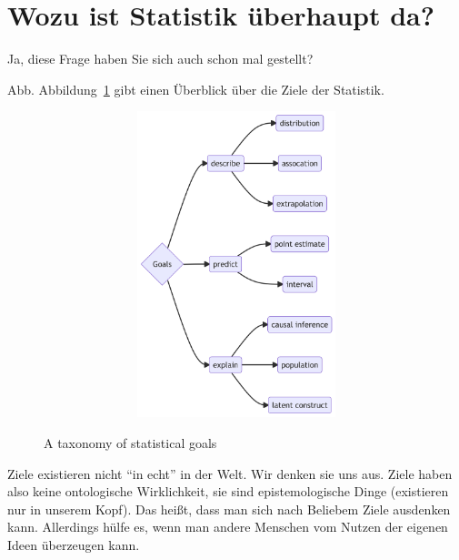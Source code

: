 \documentclass[
  a4paper,
  DIV=11]{scrreprt}
\theoremstyle{definition}
\theoremstyle{remark}
\begin{document}
\hypertarget{wozu-ist-statistik-uxfcberhaupt-da}{%
\section{Wozu ist Statistik überhaupt
da?}\label{wozu-ist-statistik-uxfcberhaupt-da}}

Ja, diese Frage haben Sie sich auch schon mal gestellt?

Abb. Abbildung~\ref{fig-goals} gibt einen Überblick über die Ziele der
Statistik.

\begin{figure}

{\centering 

\begin{figure}[H]

{\centering \includegraphics[width=5.5in,height=3.5in]{./Inferenz_files/figure-latex/mermaid-figure-1.png}

}

\end{figure}

}

\caption{\label{fig-goals}A taxonomy of statistical goals}

\end{figure}

\begin{tcolorbox}[enhanced jigsaw, leftrule=.75mm, toptitle=1mm, bottomtitle=1mm, titlerule=0mm, breakable, colframe=quarto-callout-note-color-frame, title=\textcolor{quarto-callout-note-color}{\faInfo}\hspace{0.5em}{Hinweis}, rightrule=.15mm, colback=white, arc=.35mm, left=2mm, bottomrule=.15mm, coltitle=black, opacitybacktitle=0.6, toprule=.15mm, colbacktitle=quarto-callout-note-color!10!white, opacityback=0]
Ziele existieren nicht ``in echt'' in der Welt. Wir denken sie uns aus.
Ziele haben also keine ontologische Wirklichkeit, sie sind
epistemologische Dinge (existieren nur in unserem Kopf). Das heißt, dass
man sich nach Beliebem Ziele ausdenken kann. Allerdings hülfe es, wenn
man andere Menschen vom Nutzen der eigenen Ideen überzeugen kann.
\end{tcolorbox}
\end{document}
